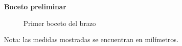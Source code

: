 \documentclass[letterpaper]{article}
\begin{document}
\begin{large}
\begin{table}[htbp]
\begin{tabular}{|l|l|}
    \end{tabular}
\end{table}

\end{large}
\newpage
\begin{large}
    \textbf{Boceto preliminar}
             \begin{figure}[htbp]
                \centering
                \caption{Primer boceto del brazo}
                \label{fig:bra}
            \end{figure}
        \begin{LARGE}
    \end{LARGE}
\end{large}
 Nota: las medidas mostradas se encuentran en milímetros.\\
 
\end{document}
